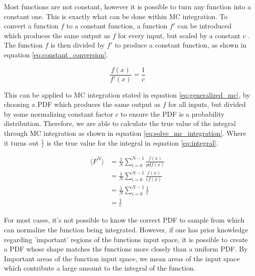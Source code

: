\documentclass[../dissertation.tex]{subfiles}
\begin{document}
Most functions are not constant, however it is possible to turn any function into a constant one. This is exactly what can be done within MC integration. To convert a function $f$ to a constant function, a function $f'$ can be introduced which produces the same output as $f$ for every input, but scaled by a constant $c$ \cite{scratchapixel_2015}. The function $f$ is then divided by $f'$ to produce a constant function, as shown in equation \ref{eq:constant_conversion}.

\begin{equation}
\label{eq:constant_conversion}
\frac{f(x)}{f'(x)} = \frac{1}{c}
\end{equation}

This can be applied to MC integration stated in equation \ref{eq:generalized_mc}, by choosing a PDF  which produces the same output as $f$ for all inputs, but divided by some normalizing constant factor $c$ to ensure the PDF is a probability distribution. Therefore, we are able to calculate the true value of the integral through MC integration as shown in equation \ref{eq:solve_mc_integration}. Where it turns out $\frac{1}{c}$ is the true value for the integral in equation \ref{eq:integral}.

\begin{align}
\label{eq:solve_mc_integration}
\langle F^N \rangle & = \frac{1}{N} \sum^{N-1}_{i=0} \frac{f(x)}{pdf(x)} \\
& = \frac{1}{N} \sum^{N-1}_{i=0} \frac{f(x)}{cf(x)} \nonumber \\
& =  \frac{1}{N} \sum^{N-1}_{i=0} \frac{1}{c} \nonumber \\
& = \frac{1}{c} \nonumber
\end{align}

For most cases, it's not possible to know the correct PDF to sample from which can normalize the function being integrated. However, if one has prior knowledge regarding 'important' regions of the functions input space, it is possible to create a PDF whose shape matches the functions more closely than a uniform PDF. By Important areas of the function input space, we mean areas of the input space which contribute a large amount to the integral of the function.
\end{document}
